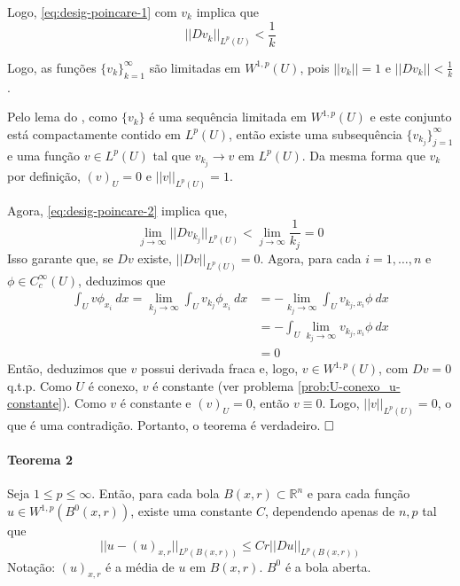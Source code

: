 \documentclass[11pt]{article}
\newcommand{\qed}{$\hfill\square$}
\begin{document}
Logo, \eqref{eq:desig-poincare-1} com $v_k$ implica que \begin{equation}\label{eq:desig-poincare-2}
	|| Dv_k||_{L^p(U)} < \frac{1}{k}
\end{equation}

Logo, as funções $\{v_k\}_{k=1}^\infty$ são limitadas em $W^{1,p}(U)$, pois $||v_k||=1$ e $||Dv_k||<\frac{1}{k}$. 

Pelo lema do , como $\{v_k\}$ é uma sequência limitada em $W^{1,p}(U)$ e este conjunto está compactamente contido em $L^p(U)$, então existe uma subsequência $\{v_{k_j}\}_{j=1}^\infty$ e uma função $v \in L^p(U)$ tal que $v_{k_j}\rightarrow v \text{ em } L^p(U)$. Da mesma forma que $v_k$ por definição, $(v)_U=0$ e $||v||_{L^p(U)}=1$.

Agora, \eqref{eq:desig-poincare-2} implica que, \begin{equation*}
	\lim_{j\rightarrow\infty} ||Dv_{k_j}||_{L^p(U)} < \lim_{j\rightarrow\infty} \frac{1}{k_j} = 0
\end{equation*} Isso garante que, se $Dv$ existe, $||Dv||_{L^p(U)}=0$. Agora, para cada $i=1,\ldots,n$ e $\phi \in C^\infty_c(U)$, deduzimos que \begin{align*}
\int_U v \phi_{x_i}\ dx = \lim_{k_j \rightarrow \infty} \int_U v_{k_j} \phi_{x_i}\ dx &= - \lim_{k_j \rightarrow \infty } \int_U v_{k_j,x_i} \phi \ dx \\ 
&=  -  \int_U \lim_{k_j \rightarrow \infty } v_{k_j,x_i} \phi \ dx \\
&= 0 \end{align*} 
Então, deduzimos que $v$ possui derivada fraca e, logo, $v \in W^{1,p}(U)$, com $Dv=0$ q.t.p. Como $U$ é conexo, $v$ é constante (ver problema \ref{prob:U-conexo_u-constante}). Como $v$ é constante e $(v)_U=0$, então $v \equiv 0$. Logo, $||v||_{L^p(U)}=0$, o que é uma contradição. Portanto, o teorema é verdadeiro. \qed



\paragraph{Teorema 2}\label{t:sobolev-poincare-2}
Seja \(1\leq p \leq \infty\). Então, para cada bola \(B(x,r)\subset \mathbb{R}^n\) e para cada função \(u \in W^{1,p}(B^0(x,r))\), existe uma constante \(C\), dependendo apenas de \(n,p\) tal que \[||u - (u)_{x,r}||_{L^p(B(x,r))} \leq Cr ||Du||_{L^p(B(x,r))}\]
Notação: \((u)_{x,r}\) é a média de \(u\) em \(B(x,r)\). \(B^0\) é a bola aberta.
\end{document}

